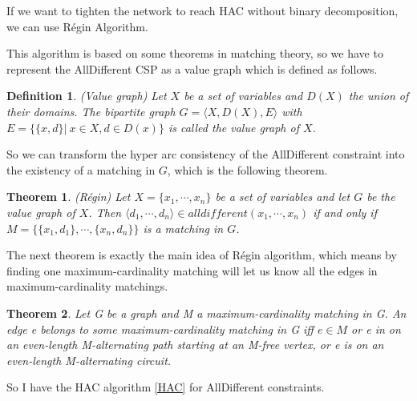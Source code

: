\documentclass[a4paper, 12pt]{report}
\newtheorem{definition}{Definition}[subsection]
\newtheorem{theorem}{Theorem}[subsection]
\begin{document}
            If we want to tighten the network to reach HAC without binary decomposition, we can use Régin Algorithm\cite{regin1994filtering, anastasatospropagation}.

            This algorithm is based on some theorems in matching theory, so we have to represent the AllDifferent CSP as a value graph which is defined as follows.

            \begin{definition}
                (Value graph) Let $X$ be a set of variables and $D(X)$ the union of their domains. The bipartite graph $G=\langle X,D(X),E\rangle$ with $E=\{\{x,d\}|\ x\in X, d\in D(x)\}$ is called the value graph of $X$.
            \end{definition}
           
            So we can transform the hyper arc consistency of the AllDifferent constraint into the existency of a matching in $G$, which is the following theorem.

            \begin{theorem}
                (Régin\cite{regin1994filtering}) Let $X=\{x_1,\cdots,x_n\}$ be a set of variables and let $G$ be the value graph of $X$. Then $\langle d_1,\cdots,d_n\rangle\in alldifferent(x_1,\cdots,x_n)$ if and only if $M=\{\{x_1,d_1\},\cdots,\{x_n,d_n\}\}$ is a matching in $G$.
            \end{theorem}

            The next theorem is exactly the main idea of Régin algorithm, which means by finding one maximum-cardinality matching will let us know all the edges in maximum-cardinality matchings.

            \begin{theorem}
                Let G be a graph and M a maximum-cardinality matching in G. An edge e belongs to some maximum-cardinality matching in G iff $e\in M$ or e in on an even-length M-alternating path starting at an M-free vertex, or e is on an even-length M-alternating circuit.
            \end{theorem}

            So I have the HAC algorithm \ref{HAC} for AllDifferent constraints.
\end{document}
